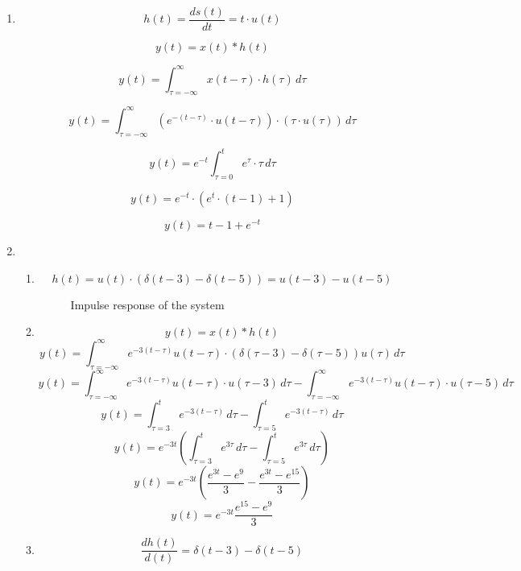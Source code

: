 \documentclass[10pt,a4paper, margin=1in]{article}
\begin{document}
\begin{enumerate}
\item %

\[ h(t) = \frac{ds(t)}{dt} = t \cdot u(t) \]

\[ y(t) = x(t) * h(t) \]

\[ y(t) = \int_{\tau=-\infty}^{\infty} x(t - \tau) \cdot h(\tau) \,d\tau \]

\[ y(t) = \int_{\tau=-\infty}^{\infty} (e^{-(t-\tau)} \cdot u(t - \tau)) \cdot (\tau \cdot u(\tau)) \,d\tau \]

\[ y(t) = e^{-t} \int_{\tau=0}^{t} e^{\tau} \cdot \tau \,d\tau \]

\[ y(t) = e^{-t} \cdot (e^{t} \cdot (t - 1) + 1) \]

\[ y(t) = t - 1 + e^{-t} \]

\item %
    \begin{enumerate}
    \item %
    \[ h(t) = u(t) \cdot (\delta(t-3) -\delta(t-5)) = u(t-3) - u(t-5) \]
    
    \begin{figure}[h!]
    \centering
        \caption{Impulse response of the system}
        \label{fig:q2}
    \end{figure}
    
    \newpage
    
    \item %
    \[ y(t) = x(t) * h(t) \]
    \[ y(t) = \int_{\tau=-\infty}^{\infty} e^{-3(t-\tau)} u(t - \tau) \cdot (\delta(\tau-3) - \delta(\tau-5)) u(\tau) \,d\tau \]
    \[ y(t) = \int_{\tau=-\infty}^{\infty} e^{-3(t-\tau)} u(t - \tau) \cdot u(\tau-3)  \,d\tau - \int_{\tau=-\infty}^{\infty} e^{-3(t-\tau)} u(t - \tau) \cdot u(\tau-5) \,d\tau \]
    \[ y(t) = \int_{\tau=3}^{t} e^{-3(t-\tau)} \,d\tau - \int_{\tau=5}^{t} e^{-3(t-\tau)} \,d\tau \]
    \[ y(t) = e^{-3t} (\int_{\tau=3}^{t} e^{3\tau} \,d\tau - \int_{\tau=5}^{t} e^{3\tau} \,d\tau) \]
    \[ y(t) = e^{-3t} (\frac{e^{3t} - e^9}{3} - \frac{e^{3t} - e^{15}}{3}) \]
    \[ y(t) = e^{-3t} \frac{e^{15} - e^9}{3} \]
    \item %
    \[ \frac{dh(t)}{d(t)} = \delta(t-3) - \delta(t-5)\]
    

\end{enumerate}
\end{enumerate}
\end{document}
